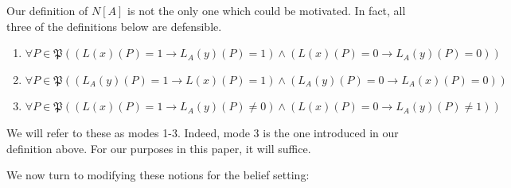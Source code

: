 \documentclass[11pt]{article}
\theoremstyle{definition}
\begin{document}
	Our definition of $N[A]$ is not the only one which could be motivated. In fact, all three of the definitions below are defensible.
	
	\begin{enumerate}
		\item $\forall P\in\mathfrak{P}((L(x)(P)=1\rightarrow L_A(y)(P)=1)\wedge(L(x)(P)=0\rightarrow L_A(y)(P)=0))$
		\item $\forall P\in\mathfrak{P}((L_A(y)(P)=1\rightarrow L(x)(P)=1)\wedge(L_A(y)(P)=0\rightarrow L_A(x)(P)=0))$
		\item $\forall P\in\mathfrak{P}((L(x)(P)=1\rightarrow L_A(y)(P)\neq 0)\wedge(L(x)(P)=0\rightarrow L_A(y)(P)\neq 1))$
	\end{enumerate}
	
	We will refer to these as modes 1-3. Indeed, mode 3 is the one introduced in our definition above. For our purposes in this paper, it will suffice.
	
	We now turn to modifying these notions for the belief setting:
	
\end{document}
